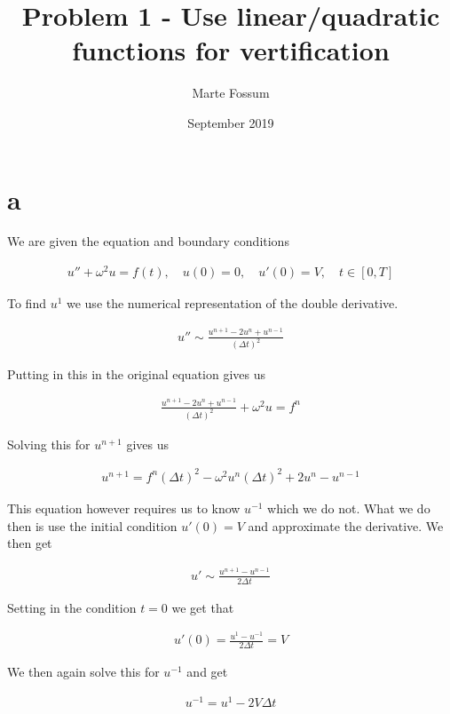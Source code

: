 \documentclass[12pt, a4paper]{article}
\title{Problem 1 - Use linear/quadratic functions for vertification}
\date{September 2019}
\author{Marte Fossum}
\begin{document}
{\setlength{\parindent}{0cm}

\maketitle
    
\section*{a}

We are given the equation and boundary conditions

\begin{align}\label{noe3}
	u'' + \omega^2u = f(t), \quad u(0) = 0, \quad u'(0) = V, \quad t \in [0, T]
\end{align}

To find \(u^1\) we use the numerical representation of the double derivative. 

\begin{align*}
	u'' \sim \frac{u^{n+1} - 2u^n + u^{n-1}}{(\Delta t)^2}
\end{align*}

Putting in this in the original equation gives us 

\begin{align*}
	\frac{u^{n+1} - 2u^n + u^{n-1}}{(\Delta t)^2} + \omega^2u = f^n 
\end{align*}

Solving this for \(u^{n+1}\) gives us 

\begin{align}\label{noe}
	u^{n+1} = f^n(\Delta t)^2 - \omega^2 u^n (\Delta t)^2 + 2u^n - u^{n-1} 
\end{align}

This equation however requires us to know \(u^{-1}\) which we do not. What we do then is use the initial condition \(u'(0) = V\) and approximate the derivative. We then get

\begin{align*}
	u' \sim \frac{u^{n+1} - u^{n-1}}{2\Delta t} 
\end{align*}

Setting in the condition \(t = 0\) we get that 

\begin{align*}
	u'(0) = \frac{u^1 - u^{-1}}{2\Delta t} = V
\end{align*}

We then again solve this for \(u^{-1}\) and get

\begin{align*}
	u^{-1} = u^1 - 2V\Delta t
\end{align*}

}
\end{document}
